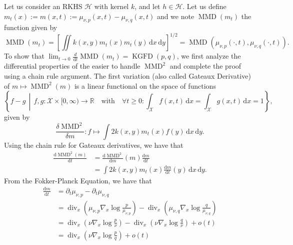 \documentclass{uai2023} %
\begin{document}
Let us consider an RKHS $ \mathcal  H $ with kernel $ k $, and let  $ h \in \mathcal  H $.
Let us define $m_t(x) := m(x, t) := \mu_{\nu,p}(x, t) - \mu_{\nu,q}(x, t) $ and we note $ \operatorname{MMD}(m_t)$ the function given by
\begin{equation*}
\operatorname{MMD}(m_t) = \left[\iint k(x, y) m_t(x) m_t(y) \, \mathrm{d}x \, \mathrm{d}y\right]^{1/2} = \operatorname{MMD}(\mu_{\nu,p}(\cdot, t), \mu_{\nu,q}(\cdot, t)).
\end{equation*}
To show that $ \lim_{ t  \to 0 } \frac{ d }{ \text{d}t }\operatorname{MMD}(m_t) = \operatorname{KGFD}(p, q) $,
we first analyze the differential properties of the easier to handle $\operatorname{MMD}^2$ and complete the proof using a chain rule argument.
The first variation (also called Gateaux Derivative) of $m  \mapsto \operatorname{MMD}^2(m)$ is a linear functional
on the space of functions
\begin{equation*}
    \left\{f - g \,\middle|\, f, g \colon \mathcal{X} \times [0, \infty) \to \mathbb{R} \quad \text{with} \quad \forall t \geq 0 \colon \int_{\mathcal{X}} f(x, t) \,\mathrm{d}x = \int_{\mathcal{X}} g(x, t) \,\mathrm{d}x = 1 \right\},
\end{equation*} given by
\begin{equation*}
\frac{ \delta \operatorname{MMD}^2 }{ \delta m} \colon f \mapsto \int 2 k(x, y) m_t(x) f(y) \,\mathrm{d}x \,\mathrm{d}y.
\end{equation*}
Using the chain rule for Gateaux derivatives, we have that
\begin{equation*}
\begin{split}
    \frac{\mathrm{d} \operatorname{MMD}^2(m)}{\mathrm{d} t} &= \frac{ \mathrm{d} \operatorname{MMD}^2}{ \mathrm{d} m}(m) \frac{ \mathrm{d} m}{ \mathrm{d} t}\\ 
	&= \int 2 k(x,y) m_t(x) \frac{\mathrm{d} m}{\mathrm{d} t}(y) \,\mathrm{d}x \,\mathrm{d}y.
\end{split}
\end{equation*}
From the Fokker-Planck Equation, we have that
\begin{equation*}
\begin{split}
    \frac{\mathrm{d}m }{\mathrm{d}t} &= \partial_t \mu_{\nu, p} - \partial_t \mu_{\nu, q} \\
				    &= \operatorname{div}_x (\mu_{\nu, p} \nabla_x \log \frac{p}{ \mu_{\nu, p} }) - \operatorname{div}_x (\mu_{\nu, q} \nabla_x \log \frac{q}{ \mu_{\nu, q} }) \\
				    &= \operatorname{div}_x (\nu \nabla_x \log \frac{ p }{ \nu}) - \operatorname{div}_x (\nu \nabla_x \log \frac{ q }{ \nu }) + o(t) \\
                    &= \operatorname{div}_x (\nu \nabla_x \log \frac{p}{q}) + o(t)
\end{split}
\end{equation*}
\end{document}
